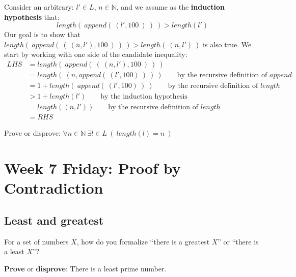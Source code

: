 \documentclass[12pt, oneside]{article}
\begin{document}
Consider an arbitrary: $l' \in L$, $n \in \mathbb{N}$, and we  assume
as the {\bf induction hypothesis} that:
\[
length(~append(~(l', 100~)~)~) > length(l')
\]
Our goal is to show that $length(~append( ~(~(n,l'), 100~)~)~) > length(~(n,l')~)$ is also true. 
We start by working with
one side of the candidate inequality:
\begin{align*}
LHS &= length(~append( ~(~ (n,l'), 100~)~)~) \\
&= length(~(n, append(~(l', 100)~)~ )~) \qquad \text{by the recursive definition of $append$}\\
&= 1 + length(~ append(~(l', 100)~) ~) \qquad \text{by the recursive definition of $length$}\\
&> 1+ length(l')  \qquad \text{by the induction hypothesis}\\
&= length( (n,l') )  \qquad \text{by the recursive definition of $length$}\\
&= RHS 
\end{align*} \newpage


Prove or disprove: $\forall n \in \mathbb{N} ~\exists l \in L ~(~length(l) = n~)$

\vspace{300pt} \newpage

\section*{Week 7 Friday: Proof by Contradiction}



 \subsection*{Least and greatest}


For a set of numbers $X$, how do you formalize ``there is a greatest $X$'' 
or ``there is a least $X$''?

\vspace{30pt}

{\bf Prove} or {\bf  disprove}:  There is a least prime number.
\end{document}
